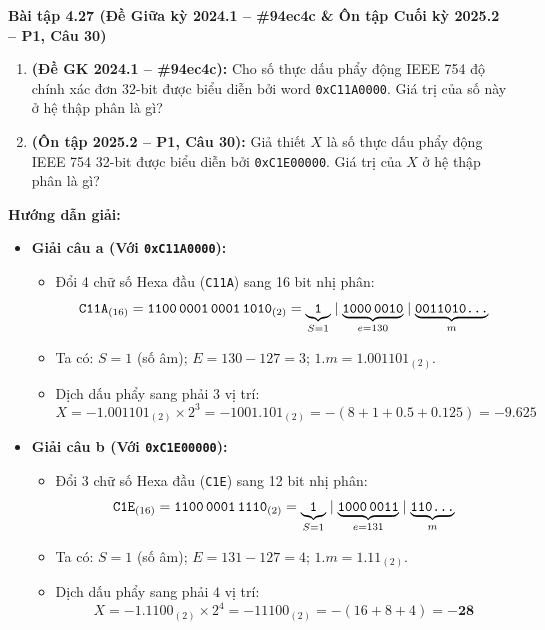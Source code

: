 \textbf{Bài tập 4.27 (Đề Giữa kỳ 2024.1 -- \#94ec4c \& Ôn tập Cuối kỳ 2025.2 -- P1, Câu 30)}
\begin{enumerate}[label=\alph*)]
    \item \textbf{(Đề GK 2024.1 -- \#94ec4c):} Cho số thực dấu phẩy động IEEE 754 độ chính xác đơn 32-bit được biểu diễn bởi word \texttt{0xC11A0000}. Giá trị của số này ở hệ thập phân là gì?
    \item \textbf{(Ôn tập 2025.2 -- P1, Câu 30):} Giả thiết $X$ là số thực dấu phẩy động IEEE 754 32-bit được biểu diễn bởi \texttt{0xC1E00000}. Giá trị của $X$ ở hệ thập phân là gì?
\end{enumerate}
\textbf{Hướng dẫn giải:}
\begin{itemize}
    \item \textbf{Giải câu a (Với \texttt{0xC11A0000}):}
    \begin{itemize}
        \item Đổi 4 chữ số Hexa đầu (\texttt{C11A}) sang 16 bit nhị phân:
        $$\texttt{C11A}_{(16)} = \texttt{1100\,0001\,0001\,1010}_{(2)} = \underbrace{\texttt{1}}_{S=1} \mid \underbrace{\texttt{1000\,0010}}_{e=130} \mid \underbrace{\texttt{0011010\dots}}_{m}$$
        \item Ta có: $S = 1$ (số âm); $E = 130 - 127 = 3$; $1.m = 1.001101_{(2)}$.
        \item Dịch dấu phẩy sang phải $3$ vị trí:
        $$X = -1.001101_{(2)} \times 2^3 = -1001.101_{(2)} = -(8 + 1 + 0.5 + 0.125) = \mathbf{-9.625}$$
    \end{itemize}
    \item \textbf{Giải câu b (Với \texttt{0xC1E00000}):}
    \begin{itemize}
        \item Đổi 3 chữ số Hexa đầu (\texttt{C1E}) sang 12 bit nhị phân:
        $$\texttt{C1E}_{(16)} = \texttt{1100\,0001\,1110}_{(2)} = \underbrace{\texttt{1}}_{S=1} \mid \underbrace{\texttt{1000\,0011}}_{e=131} \mid \underbrace{\texttt{110\dots}}_{m}$$
        \item Ta có: $S = 1$ (số âm); $E = 131 - 127 = 4$; $1.m = 1.11_{(2)}$.
        \item Dịch dấu phẩy sang phải $4$ vị trí:
        $$X = -1.1100_{(2)} \times 2^4 = -11100_{(2)} = -(16 + 8 + 4) = \mathbf{-28}$$
    \end{itemize}
\end{itemize}

